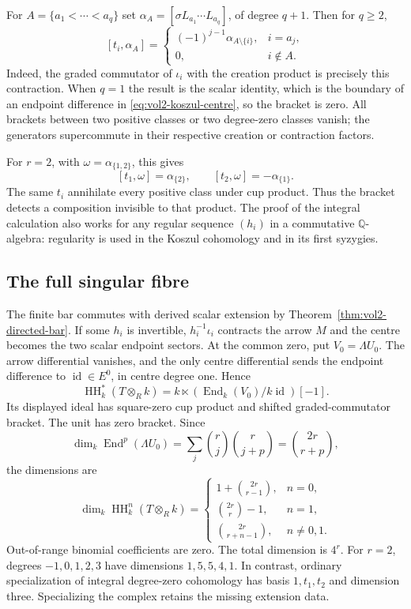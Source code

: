 For $A=\{a_1<\cdots<a_q\}$ set
$\alpha_A=[\sigma L_{a_1}\cdots L_{a_q}]$, of degree $q+1$.
Then for $q\geq2$,
\begin{equation}\label{eq:vol2-koszul-contraction-brackets}
 [t_i,\alpha_A]=
 \begin{cases}
 (-1)^{j-1}\alpha_{A\setminus\{i\}},&i=a_j,\\
 0,&i\notin A.
 \end{cases}
\end{equation}
Indeed, the graded commutator of $\iota_i$ with the creation
product is precisely this contraction. When $q=1$ the result
is the scalar identity, which is the boundary of an endpoint
difference in \eqref{eq:vol2-koszul-centre}, so the bracket
is zero. All brackets between two positive classes or two
degree-zero classes vanish; the generators supercommute in
their respective creation or contraction factors.

For $r=2$, with $\omega=\alpha_{\{1,2\}}$, this gives
\[
 [t_1,\omega]=\alpha_{\{2\}},\qquad
 [t_2,\omega]=-\alpha_{\{1\}}.
\]
The same $t_i$ annihilate every positive class under cup
product. Thus the bracket detects a composition invisible
to that product. The proof of the integral calculation also
works for any regular sequence $(h_i)$ in a commutative
$\mathbb Q$-algebra: regularity is used in the Koszul
cohomology and in its first syzygies.

\subsection{The full singular fibre}

The finite bar commutes with derived scalar extension by
Theorem~\ref{thm:vol2-directed-bar}. If some $h_i$ is invertible,
$h_i^{-1}\iota_i$ contracts the arrow $M$ and the centre becomes
the two scalar endpoint sectors. At the common zero, put
$V_0=\Lambda U_0$. The arrow differential vanishes, and the
only centre differential sends the endpoint difference to
$\operatorname{id}\in E^0$, in centre degree one. Hence
\begin{equation}\label{eq:vol2-koszul-singular-fibre}
 \operatorname{HH}_k^*(T\otimes_Rk)
   =k\ltimes(\operatorname{End}_k(V_0)/k\operatorname{id})[-1].
\end{equation}
Its displayed ideal has square-zero cup product and shifted
graded-commutator bracket. The unit has zero bracket.
Since
\[
 \dim_k\operatorname{End}^p(\Lambda U_0)
    =\sum_j\binom rj\binom r{j+p}=\binom{2r}{r+p},
\]
the dimensions are
\begin{equation}\label{eq:vol2-koszul-fibre-dimensions}
 \dim_k\operatorname{HH}^n_k(T\otimes_Rk)=
 \begin{cases}
 1+\binom{2r}{r-1},&n=0,\\
 \binom{2r}{r}-1,&n=1,\\
 \binom{2r}{r+n-1},&n\ne0,1.
 \end{cases}
\end{equation}
Out-of-range binomial coefficients are zero. The total dimension
is $4^r$. For $r=2$, degrees $-1,0,1,2,3$ have dimensions
$1,5,5,4,1$. In contrast, ordinary specialization of integral
degree-zero cohomology has basis $1,t_1,t_2$ and dimension three.
Specializing the complex retains the missing extension data.

